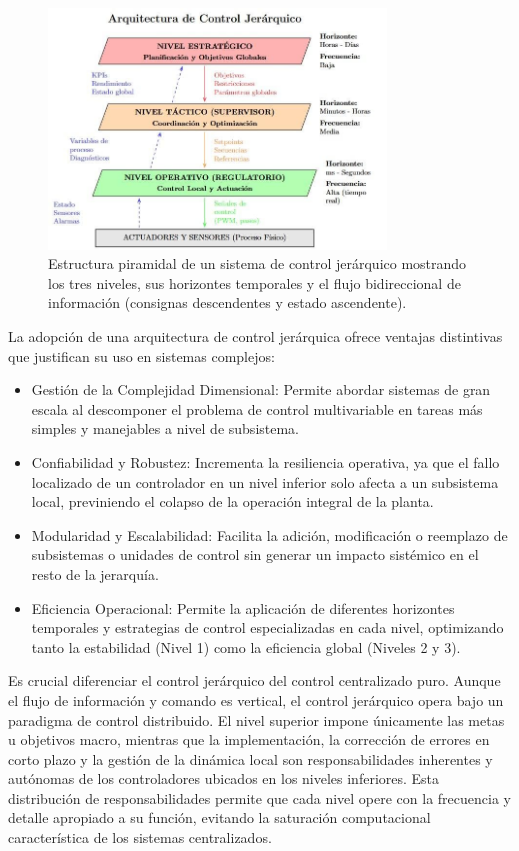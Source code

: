 \begin{figure}[H]
    \centering
    \includegraphics[width=0.8\textwidth]{img/jerarquia_control.jpg}
    \caption{Estructura piramidal de un sistema de control jerárquico mostrando los tres niveles, sus horizontes temporales y el flujo bidireccional de información (consignas descendentes y estado ascendente).}
    \label{fig:jerarquia_control}
\end{figure}
La adopción de una arquitectura de control jerárquica ofrece ventajas distintivas que justifican su uso en sistemas complejos:
\begin{itemize}
    \item Gestión de la Complejidad Dimensional: Permite abordar sistemas de gran escala al descomponer el problema de control multivariable en tareas más simples y manejables a nivel de subsistema.
    \item Confiabilidad y Robustez: Incrementa la resiliencia operativa, ya que el fallo localizado de un controlador en un nivel inferior solo afecta a un subsistema local, previniendo el colapso de la operación integral de la planta.
    \item Modularidad y Escalabilidad: Facilita la adición, modificación o reemplazo de subsistemas o unidades de control sin generar un impacto sistémico en el resto de la jerarquía.
    \item Eficiencia Operacional: Permite la aplicación de diferentes horizontes temporales y estrategias de control especializadas en cada nivel, optimizando tanto la estabilidad (Nivel 1) como la eficiencia global (Niveles 2 y 3).
\end{itemize}
Es crucial diferenciar el control jerárquico del control centralizado puro. Aunque el flujo de información y comando es vertical, el control jerárquico opera bajo un paradigma de control distribuido. El nivel superior impone únicamente las metas u objetivos macro, mientras que la implementación, la corrección de errores en corto plazo y la gestión de la dinámica local son responsabilidades inherentes y autónomas de los controladores ubicados en los niveles inferiores. Esta distribución de responsabilidades permite que cada nivel opere con la frecuencia y detalle apropiado a su función, evitando la saturación computacional característica de los sistemas centralizados.

